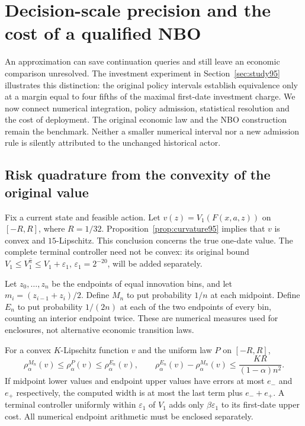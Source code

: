 \section{Decision-scale precision and the cost of a qualified NBO}\label{sec:precision96}
An approximation can save continuation queries and still leave an economic comparison unresolved. The investment experiment in Section~\ref{sec:study95} illustrates this distinction: the original policy intervals establish equivalence only at a margin equal to four fifths of the maximal first-date investment charge. We now connect numerical integration, policy admission, statistical resolution and the cost of deployment. The original economic law and the NBO construction remain the benchmark. Neither a smaller numerical interval nor a new admission rule is silently attributed to the unchanged historical actor.

\subsection{Risk quadrature from the convexity of the original value}
Fix a current state and feasible action. Let $v(z)=V_1(F(x,a,z))$ on $[-R,R]$, where $R=1/32$. Proposition~\ref{prop:curvature95} implies that $v$ is convex and $15$-Lipschitz. This conclusion concerns the true one-date value. The complete terminal controller need not be convex: its original bound $V_1\leq V_1^{\widehat\pi}\leq V_1+\varepsilon_1$, $\varepsilon_1=2^{-20}$, will be added separately.

Let $z_0,\ldots,z_n$ be the endpoints of equal innovation bins, and let $m_i=(z_{i-1}+z_i)/2$. Define $M_n$ to put probability $1/n$ at each midpoint. Define $E_n$ to put probability $1/(2n)$ at each of the two endpoints of every bin, counting an interior endpoint twice. These are numerical measures used for enclosures, not alternative economic transition laws.

\begin{proposition}\label{prop:quadrature96}
For a convex $K$-Lipschitz function $v$ and the uniform law $P$ on $[-R,R]$,
\begin{equation}\label{eq:quad96}
 \rho_\alpha^{M_n}(v)\leq\rho_\alpha^P(v)
                 \leq\rho_\alpha^{E_n}(v),\qquad
 \rho_\alpha^{E_n}(v)-\rho_\alpha^{M_n}(v)
          \leq\frac{KR}{(1-\alpha)n^2}.
\end{equation}
If midpoint lower values and endpoint upper values have errors at most $e_-$ and $e_+$ respectively, the computed width is at most the last term plus $e_-+e_+$. A terminal controller uniformly within $\varepsilon_1$ of $V_1$ adds only $\beta\varepsilon_1$ to its first-date upper cost. All numerical endpoint arithmetic must be enclosed separately.
\end{proposition}

